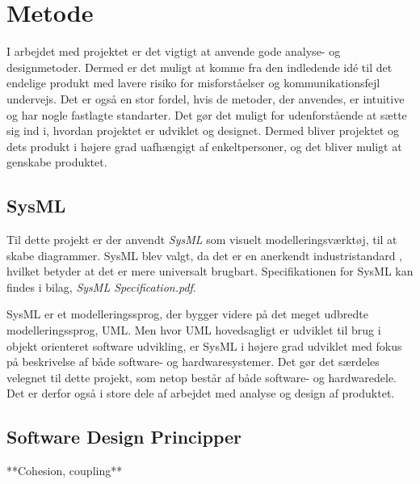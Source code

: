 \chapter{Metode}
I arbejdet med projektet er det vigtigt at anvende gode analyse- og designmetoder. Dermed er det muligt at komme fra den indledende idé til det endelige produkt med lavere risiko for misforståelser og kommunikationsfejl undervejs. Det er også en stor fordel, hvis de metoder, der anvendes, er intuitive og har nogle fastlagte standarter. Det gør det muligt for udenforstående at sætte sig ind i, hvordan projektet er udviklet og designet. Dermed bliver projektet og dets produkt i højere grad uafhængigt af enkeltpersoner, og det bliver muligt at genskabe produktet.

\section{SysML}
Til dette projekt er der anvendt \textit{SysML} som visuelt modelleringsværktøj, til at skabe diagrammer. SysML blev valgt, da det er en anerkendt industristandard\cite{website:SysML} , hvilket betyder at det er mere universalt brugbart. Specifikationen for SysML kan findes i bilag, \textit{SysML Specification.pdf}.

SysML er et modelleringssprog, der bygger videre på det meget udbredte modelleringssprog, UML. Men hvor UML hovedsagligt er udviklet til brug i objekt orienteret software udvikling, er SysML i højere grad udviklet med fokus på beskrivelse af både software- og hardwaresystemer. Det gør det særdeles velegnet til dette projekt, som netop består af både software- og hardwaredele. Det er derfor også i store dele af arbejdet med analyse og design af produktet.


\section{Software Design Principper}

**Cohesion, coupling**
